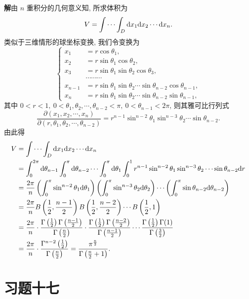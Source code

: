 \documentclass[UTF8, 12pt, fontset=fandol, oneside]{ctexart}
\begin{document}
\noindent\textbf{解}\quad 由 $n$ 重积分的几何意义知, 所求体积为
\[
  V=\idotsint_D \mathrm dx_1\mathrm dx_2\cdots\mathrm dx_n.
\]
类似于三维情形的球坐标变换, 我们令变换为
\[
\left\{
\begin{aligned}
  x_1&=r\cos\theta_1,\\
  x_2&=r\sin\theta_1\cos\theta_2,\\
  x_3&=r\sin\theta_1\sin\theta_2\cos\theta_3,\\
  &\cdots\cdots\cdots\\
  x_{n-1}&=r\sin\theta_1\sin\theta_2\cdots\sin\theta_{n-2}\cos\theta_{n-1},\\
  x_n&=r\sin\theta_1\sin\theta_2\cdots\sin\theta_{n-2}\sin\theta_{n-1},
\end{aligned}
\right.
\]
其中 $0<r<1,\ 0<\theta_1,\theta_2,\cdots,\theta_{n-2}<\pi,\ 0<\theta_{n-1}<2\pi$, 则其雅可比行列式
\[
  \frac{\partial(x_1,x_2,\cdots,x_n)}
  {\partial(r,\theta_1,\theta_2,\cdots,\theta_{n-2})}
  =r^{n-1}\sin^{n-2}\theta_1\sin^{n-3}\theta_2\cdots\sin\theta_{n-2}.
\]
由此得
\[
\begin{aligned}
  V
  &=\idotsint_D \mathrm dx_1\mathrm dx_2\cdots\mathrm dx_n\\
  &=\int_0^{2\pi}\mathrm d\theta_{n-1}\int_0^\pi\mathrm d\theta_{n-2}
    \cdots\int_0^\pi\mathrm d\theta_1\int_0^1
    r^{n-1}\sin^{n-2}\theta_1\sin^{n-3}\theta_2\cdots
    \sin\theta_{n-2}\mathrm dr\\
  &=\frac{2\pi}{n}
    \left(\int_0^\pi\sin^{n-2}\theta_1\mathrm d\theta_1\right)
    \left(\int_0^\pi\sin^{n-3}\theta_2\mathrm d\theta_2\right)\cdots
    \left(\int_0^\pi\sin\theta_{n-2}\mathrm d\theta_{n-2}\right)\\
  &=\frac{2\pi}{n}
    B\left(\frac12,\frac{n-1}{2}\right)
    B\left(\frac12,\frac{n-2}{2}\right)\cdots B\left(\frac12,1\right)\\
  &=\frac{2\pi}{n}\cdot
    \frac{\Gamma\left(\frac12\right)\Gamma\left(\frac{n-1}{2}\right)}{\Gamma\left(\frac n2\right)}
    \cdot
    \frac{\Gamma\left(\frac12\right)\Gamma\left(\frac{n-2}{2}\right)}{\Gamma\left(\frac{n-1}{2}\right)}
    \cdots
    \frac{\Gamma\left(\frac12\right)\Gamma(1)}{\Gamma\left(\frac32\right)}\\
  &=\frac{2\pi}{n}\cdot
    \frac{\Gamma^{n-2}\left(\frac12\right)}{\Gamma\left(\frac n2\right)}
  =\frac{\pi^{\frac n2}}{\Gamma\left(\frac n2+1\right)}.
\end{aligned}
\]

\section*{习题十七}
\end{document}
